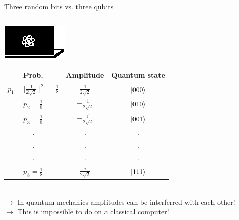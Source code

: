 \documentclass[10pt]{beamer}
\begin{document}
{\begin{frame}[fragile]{Three random bits vs. three qubits}
\begin{minipage}[c]{0.39\textwidth}
\begin{tabular}{c | c}
\end{tabular}
\end{minipage}%
\begin{minipage}[c]{0.59\textwidth}
\centering
\includegraphics[scale=1.2]{Vectors/laptop_q.eps}\\
\vspace{0.5cm}
\begin{tabular}{c | c | c}
	Prob. & Amplitude & Quantum state \\
	\midrule
	$p_1 = \mid\frac{1}{2\sqrt{2}}\mid^2 = \frac{1}{8}$ & $\frac{1}{2\sqrt{2}}$ & $\ket{000}$ \\
	$p_2 =\frac{1}{8}$ & $-\frac{1}{2\sqrt{2}}$ & $\ket{010}$ \\
	$p_3 = \frac{1}{8}$ & $-\frac{i}{2\sqrt{2}}$ & $\ket{001}$ \\
	. & .  & .\\
	. & . & .\\
	. & . & .\\
	$p_8 = \frac{1}{8}$ & $\frac{i}{2\sqrt{2}}$ & $\ket{111}$ \\
	
\end{tabular}
\end{minipage}\\
\vspace{0.5cm}
$\rightarrow$ In quantum mechanics amplitudes can be interferred with each other!\\
$\rightarrow$ This is impossible to do on a classical computer!
\end{frame}
}
\end{document}
